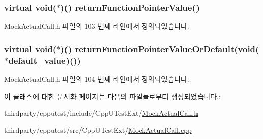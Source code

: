 \subsubsection[{\texorpdfstring{return\+Function\+Pointer\+Value}{returnFunctionPointerValue}}]{\setlength{\rightskip}{0pt plus 5cm}virtual void($\ast$)() return\+Function\+Pointer\+Value()}\hypertarget{class_mock_actual_call_abd8adc7ad48025440b2a4aee485f560d}{}\label{class_mock_actual_call_abd8adc7ad48025440b2a4aee485f560d}


Mock\+Actual\+Call.\+h 파일의 103 번째 라인에서 정의되었습니다.

\subsubsection[{\texorpdfstring{return\+Function\+Pointer\+Value\+Or\+Default}{returnFunctionPointerValueOrDefault}}]{\setlength{\rightskip}{0pt plus 5cm}virtual void($\ast$)() return\+Function\+Pointer\+Value\+Or\+Default(void($\ast$default\+\_\+value)())}\hypertarget{class_mock_actual_call_a01e3ba55118ba079117b1ab3b03d3b0e}{}\label{class_mock_actual_call_a01e3ba55118ba079117b1ab3b03d3b0e}


Mock\+Actual\+Call.\+h 파일의 104 번째 라인에서 정의되었습니다.



이 클래스에 대한 문서화 페이지는 다음의 파일들로부터 생성되었습니다.\+:\begin{DoxyCompactItemize}
\item 
thirdparty/cpputest/include/\+Cpp\+U\+Test\+Ext/\hyperlink{_mock_actual_call_8h}{Mock\+Actual\+Call.\+h}\item 
thirdparty/cpputest/src/\+Cpp\+U\+Test\+Ext/\hyperlink{_mock_actual_call_8cpp}{Mock\+Actual\+Call.\+cpp}\end{DoxyCompactItemize}
